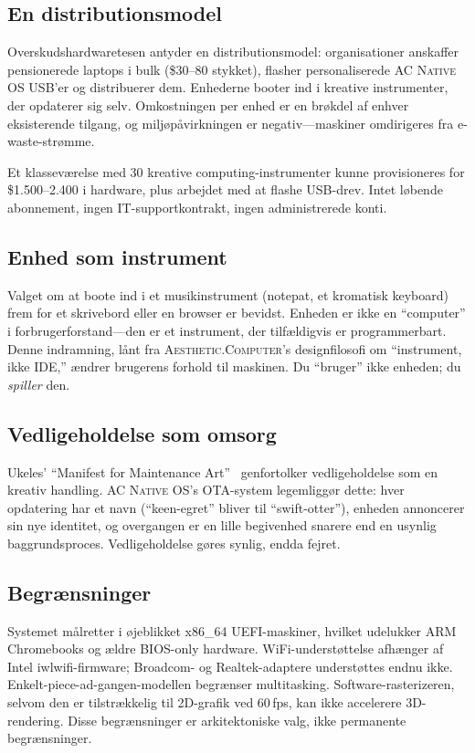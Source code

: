 \documentclass[10pt,letterpaper,twocolumn]{article}
\newcommand{\ac}{\textsc{Aesthetic.Computer}}
\newcommand{\acos}{\textsc{AC Native OS}}
\begin{document}
\subsection{En distributionsmodel}

Overskudshardwaretesen antyder en distributionsmodel: organisationer anskaffer pensionerede laptops i bulk (\$30--80 stykket), flasher personaliserede \acos{} USB'er og distribuerer dem. Enhederne booter ind i kreative instrumenter, der opdaterer sig selv. Omkostningen per enhed er en brøkdel af enhver eksisterende tilgang, og miljøpåvirkningen er negativ---maskiner omdirigeres fra e-waste-strømme.

Et klasseværelse med 30 kreative computing-instrumenter kunne provisioneres for \$1.500--2.400 i hardware, plus arbejdet med at flashe USB-drev. Intet løbende abonnement, ingen IT-supportkontrakt, ingen administrerede konti.

\subsection{Enhed som instrument}

Valget om at boote ind i et musikinstrument (notepat, et kromatisk keyboard) frem for et skrivebord eller en browser er bevidst. Enheden er ikke en ``computer'' i forbrugerforstand---den er et instrument, der tilfældigvis er programmerbart. Denne indramning, lånt fra \ac{}'s designfilosofi om ``instrument, ikke IDE,'' ændrer brugerens forhold til maskinen. Du ``bruger'' ikke enheden; du \emph{spiller} den.

\subsection{Vedligeholdelse som omsorg}

Ukeles' ``Manifest for Maintenance Art''~\citep{ukeles1969manifesto} genfortolker vedligeholdelse som en kreativ handling. \acos{}'s OTA-system legemliggør dette: hver opdatering har et navn (``keen-egret'' bliver til ``swift-otter''), enheden annoncerer sin nye identitet, og overgangen er en lille begivenhed snarere end en usynlig baggrundsproces. Vedligeholdelse gøres synlig, endda fejret.

\subsection{Begrænsninger}

Systemet målretter i øjeblikket x86\_64 UEFI-maskiner, hvilket udelukker ARM Chromebooks og ældre BIOS-only hardware. WiFi-understøttelse afhænger af Intel iwlwifi-firmware; Broadcom- og Realtek-adaptere understøttes endnu ikke. Enkelt-piece-ad-gangen-modellen begrænser multitasking. Software-rasterizeren, selvom den er tilstrækkelig til 2D-grafik ved 60\,fps, kan ikke accelerere 3D-rendering. Disse begrænsninger er arkitektoniske valg, ikke permanente begrænsninger.
\end{document}
